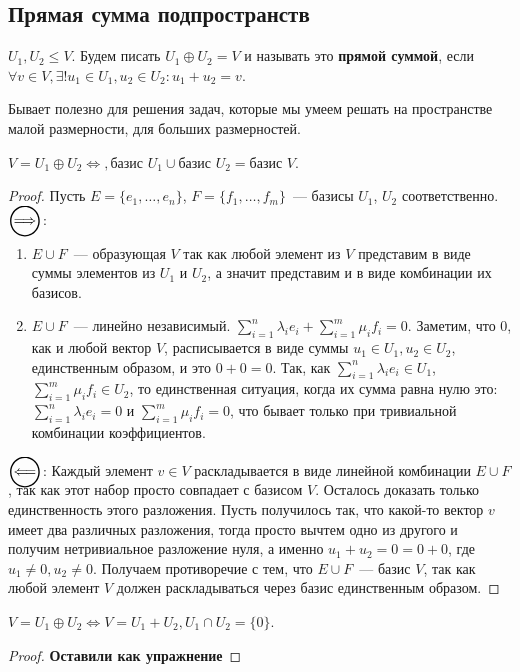 \subsection{Прямая сумма подпространств}
\begin{definition} 
    $U_1, U_2\le V$. Будем писать $U_1 \oplus U_2 = V$ и называть это \textbf{прямой суммой}, если
    $\forall v\in V, \exists! u_1\in U_1, u_2\in U_2\colon u_1 + u_2 = v$.
\end{definition}
\begin{motivation}
    Бывает полезно для решения задач, которые мы умеем решать на пространстве малой размерности, для
    больших размерностей.
\end{motivation}
\begin{remark}
    $V = U_1\oplus U_2\Leftrightarrow, \text{базис } U_1 \cup \text{базис } U_2 = \text{базис } V$.
\end{remark}
\begin{proof}
    Пусть $E = \{e_1,\dots, e_n\}$, $F = \{f_1,\dots,f_m\}$~--- базисы $U_1$, $U_2$ соответственно.
    $\ora$:
        \begin{enumerate}
            \item $E\cup F$~--- образующая $V$ так как любой элемент из $V$ представим в виде суммы элементов
                из $U_1$ и $U_2$, а значит представим и в виде комбинации их базисов.
            \item $E\cup F$~--- линейно независимый. 
                $\sum\limits_{i=1}^{n} \lambda_ie_i + \sum\limits_{i=1}^{m} \mu_if_i = 0$. 
                Заметим, что $0$, как и любой вектор $V$, расписывается в виде суммы $u_1\in U_1, u_2\in U_2$,
                единственным образом, и это $0 + 0 = 0$. Так, как
                $\sum\limits_{i=1}^{n} \lambda_ie_i \in U_1$, $\sum\limits_{i=1}^{m} \mu_if_i \in U_2$,
                то единственная ситуация, когда их сумма равна нулю это:
                $\sum\limits_{i=1}^{n} \lambda_ie_i = 0$ и $\sum\limits_{i=1}^{m} \mu_if_i = 0$,
                что бывает только при тривиальной комбинации коэффициентов.
        \end{enumerate}
    $\ola$:
        Каждый элемент $v\in V$ раскладывается в виде линейной комбинации $E\cup F$, так как этот набор
        просто совпадает с базисом $V$. Осталось доказать только единственность этого разложения. 
        Пусть получилось так, что какой-то вектор $v$ имеет два различных разложения, тогда просто вычтем 
        одно из другого и получим нетривиальное разложение нуля, а именно $u_1 + u_2 = 0 = 0 + 0$, где
        $u_1\not=0, u_2\not=0$. Получаем противоречие с тем, что $E\cup F$~--- базис $V$, так как любой
        элемент $V$ должен раскладываться через базис единственным образом.
\end{proof}
\begin{remark}
    $V = U_1\oplus U_2 \Leftrightarrow V = U_1 + U_2,  U_1 \cap U_2 = \{0\}$. 
\end{remark}
\begin{proof}
    \textbf{Оставили как упражнение}
\end{proof}
